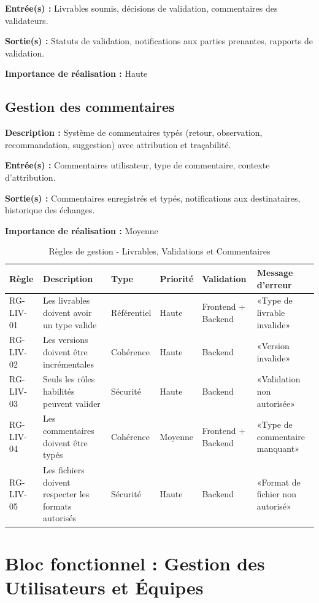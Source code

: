 \textbf{Entrée(s) :} Livrables soumis, décisions de validation, commentaires des validateurs.

\textbf{Sortie(s) :} Statuts de validation, notifications aux parties prenantes, rapports de validation.

\textbf{Importance de réalisation :} Haute

\subsection{Gestion des commentaires}
\textbf{Description :} Système de commentaires typés (retour, observation, recommandation, suggestion) avec attribution et traçabilité.

\textbf{Entrée(s) :} Commentaires utilisateur, type de commentaire, contexte d'attribution.

\textbf{Sortie(s) :} Commentaires enregistrés et typés, notifications aux destinataires, historique des échanges.

\textbf{Importance de réalisation :} Moyenne

\begin{table}[H]
\centering
\footnotesize
\begin{tabular}{|p{1.5cm}|p{3.5cm}|p{1.5cm}|p{1.5cm}|p{2cm}|p{2.5cm}|}
\hline
\textbf{Règle} & \textbf{Description} & \textbf{Type} & \textbf{Priorité} & \textbf{Validation} & \textbf{Message d'erreur} \\
\hline
RG-LIV-01 & Les livrables doivent avoir un type valide & Référentiel & Haute & Frontend + Backend & «Type de livrable invalide» \\
\hline
RG-LIV-02 & Les versions doivent être incrémentales & Cohérence & Haute & Backend & «Version invalide» \\
\hline
RG-LIV-03 & Seuls les rôles habilités peuvent valider & Sécurité & Haute & Backend & «Validation non autorisée» \\
\hline
RG-LIV-04 & Les commentaires doivent être typés & Cohérence & Moyenne & Frontend + Backend & «Type de commentaire manquant» \\
\hline
RG-LIV-05 & Les fichiers doivent respecter les formats autorisés & Sécurité & Haute & Backend & «Format de fichier non autorisé» \\
\hline
\end{tabular}
\caption{Règles de gestion - Livrables, Validations et Commentaires}
\label{tab:rg_livrables}
\end{table}

\section{Bloc fonctionnel : Gestion des Utilisateurs et Équipes}

